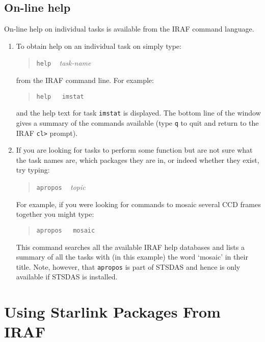 \documentclass[twoside,11pt]{article}
\newcommand{\xlabel}[1]{}
\begin{document}
\subsection{\label{OHELP}On-line help}

On-line help on individual tasks is available from the IRAF command
language.

\begin{enumerate}

  \item To obtain help on an individual task on simply type:

  \begin{quote}
   {\tt help} ~ {\it task-name}
  \end{quote}

   from the IRAF command line.  For example:

  \begin{quote}
   {\tt help ~ imstat}
  \end{quote}

   and the help text for task {\tt imstat} is displayed.  The bottom
   line of the window gives a summary of the commands available (type
   {\tt q} to quit and return to the IRAF \verb-cl>- prompt).

  \item If you are looking for tasks to perform some function but are
   not sure what the task names are, which packages they are in, or indeed
   whether they exist, try typing:

  \begin{quote}
   {\tt apropos} ~ {\it topic}
  \end{quote}

   For example, if you were looking for commands to mosaic several CCD
   frames together you might type:

  \begin{quote}
   {\tt apropos ~ mosaic}
  \end{quote}

   This command searches all the available IRAF help databases and lists
   a summary of all the tasks with (in this example) the word `mosaic'
   in their title.  Note, however, that {\tt apropos} is part of STSDAS
   and hence is only available if STSDAS is installed.

\end{enumerate}


\newpage
\section{\xlabel{STARSESS}\label{STARSESS}Using Starlink Packages From IRAF}
\end{document}

